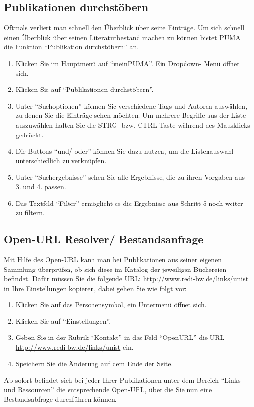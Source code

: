 \documentclass[b5paper,11pt,twoside]{scrbook} %
\begin{document}
\subsection{Publikationen durchstöbern}
Oftmals verliert man schnell den Überblick über seine Einträge. Um sich schnell einen Überblick über seinen Literaturbestand machen zu können bietet PUMA die Funktion \enquote{Publikation durchstöbern} an. 
\begin{enumerate}
    \item Klicken Sie im Hauptmenü auf \enquote{meinPUMA}. Ein Dropdown- Menü öffnet sich.
    \item Klicken Sie auf \enquote{Publikationen durchstöbern}.
    \item Unter \enquote{Suchoptionen} können Sie verschiedene Tags und Autoren auswählen, zu denen Sie die Einträge sehen möchten. Um mehrere Begriffe aus der Liste auszuwählen halten Sie die STRG- bzw. CTRL-Taste während des Mausklicks gedrückt.
    \item Die Buttons \enquote{und/ oder} können Sie dazu nutzen, um die Listenauswahl unterschiedlich zu verknüpfen. 
    \item Unter \enquote{Suchergebnisse} sehen Sie alle Ergebnisse, die zu ihren Vorgaben aus 3. und 4. passen.
    \item Das Textfeld \enquote{Filter} ermöglicht es die Ergebnisse aus Schritt 5 noch weiter zu filtern.
\end{enumerate}

\subsection{Open-URL Resolver/ Bestandsanfrage}
Mit Hilfe des Open-URL kann man bei Publikationen aus seiner eigenen Sammlung überprüfen, ob sich diese im Katalog der jeweiligen Büchereien befindet. Dafür müssen Sie  die folgende URL:  
\url{http://www.redi-bw.de/links/unist} in Ihre Einstellungen kopieren, dabei gehen Sie wie folgt vor:
\begin{enumerate}
    \item Klicken Sie auf das Personensymbol, ein Untermenü öffnet sich.
    \item Klicken Sie auf \enquote{Einstellungen}.
    \item Geben Sie in der Rubrik \enquote{Kontakt} in das Feld \enquote{OpenURL} die URL \url{http://www.redi-bw.de/links/unist} ein. 
    \item Speichern Sie die Änderung auf dem Ende der Seite.
\end{enumerate}
Ab sofort befindet sich bei jeder Ihrer Publikationen unter dem Bereich \enquote{Links und Ressourcen} die entsprechende Open-URL, über die Sie nun eine Bestandsabfrage durchführen können.
\end{document}
